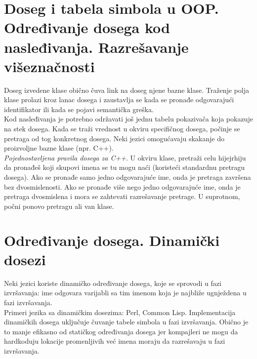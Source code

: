 \documentclass[10pt]{extarticle}
\begin{document}
\section{Doseg i tabela simbola u OOP. Određivanje dosega kod nasleđivanja. Razrešavanje višeznačnosti}
\noindent
Doseg izvedene klase obično čuva link na doseg njene bazne klase. Traženje polja klase prolazi kroz lanac dosega i zaustavlja se kada se pronađe odgovarajući identifikator ili kada se pojavi semantička greška. \\
Kod nasleđivanja je potrebno održavati još jednu tabelu pokazivača koja pokazuje na stek dosega. Kada se traži vrednost u okviru specifičnog dosega, počinje se pretraga od tog konkretnog dosega. Neki jezici omogućavaju skakanje do proizvoljne bazne klase (npr. C++). \\
\textit{Pojednostavljena pravila dosega za C++}. U okviru klase, pretraži celu hijejrhiju da pronađeš koji skupovi imena se tu mogu naći (koristeći standardnu pretragu dosega). Ako se pronađe samo jedno odgovarajuće ime, onda je pretraga završena bez dvosmislenosti. Ako se pronađe više nego jedno odgovarajuće ime, onda je pretraga dvosmislena i mora se zahtevati razrešavanje pretrage. U suprotnom, počni ponovo pretragu ali van klase.

\section{Određivanje dosega. Dinamički dosezi}
\noindent
Neki jezici koriste dinamičko određivanje dosega, koje se sprovodi u fazi izvršavanja: ime odgovara varijabli sa tim imenom koja je najbliže ugnježdena u fazi izvršavanja. \\
Primeri jezika sa dinamičkim dosezima: Perl, Common Lisp. Implementacija dinamičkih dosega uključuje čuvanje tabele simbola u fazi izvršavanja. Obično je to manje efikasno od statičkog određivanja dosega jer kompajleri ne mogu da hardkoduju lokacije promenljivih već imena moraju da razrešavaju u fazi izvršavanja.
\end{document}
